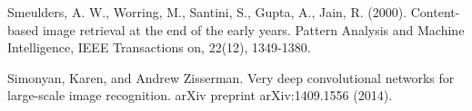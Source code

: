 \begin{thebibliography}{99}


Smeulders, A. W., Worring, M., Santini, S., Gupta, A., Jain, R. (2000). Content-based image retrieval at the end of the early years. Pattern Analysis and Machine Intelligence, IEEE Transactions on, 22(12), 1349-1380.

Simonyan, Karen, and Andrew Zisserman. Very deep convolutional networks for large-scale image recognition. arXiv preprint arXiv:1409.1556 (2014).

\end{thebibliography}
